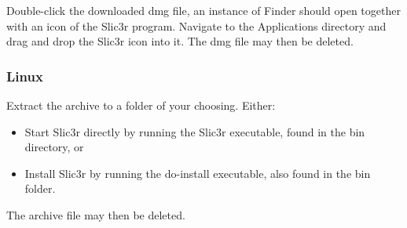 Double-click the downloaded dmg file, an instance of Finder should open together with an icon of the Slic3r program.  Navigate to the Applications directory and drag and drop the Slic3r icon into it.
The dmg file may then be deleted.

\subsubsection{Linux}

Extract the archive to a folder of your choosing.
Either:
\begin{itemize}
\item Start Slic3r directly by running the Slic3r executable, found in the bin directory, or
\item Install Slic3r by running the do-install executable, also found in the bin folder.
\end{itemize}
The archive file may then be deleted.
